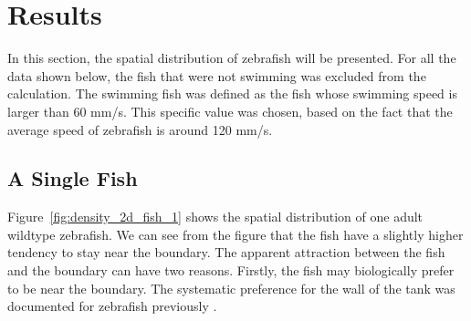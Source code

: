 \documentclass[11pt,twoside]{report}
\begin{document}
\section{Results}

In this section, the spatial distribution of zebrafish will be presented. For all the data shown below, the fish that were not swimming was excluded from the calculation. The swimming fish was defined as the fish whose swimming speed is larger than 60 mm/s. This specific value was chosen, based on the fact that the average speed of zebrafish is around 120 mm/s.

\subsection{A Single Fish}
\label{section:fish_1_2d}



Figure~\ref{fig:density_2d_fish_1} shows the spatial distribution of one adult wildtype zebrafish. We can see from the figure that the fish have a slightly higher tendency to stay near the boundary. The apparent attraction between the fish and the boundary can have two reasons. Firstly, the fish may biologically prefer to be near the boundary. The systematic preference for the wall of the tank was documented for zebrafish previously \cite{seguret2016}. 
\end{document}
